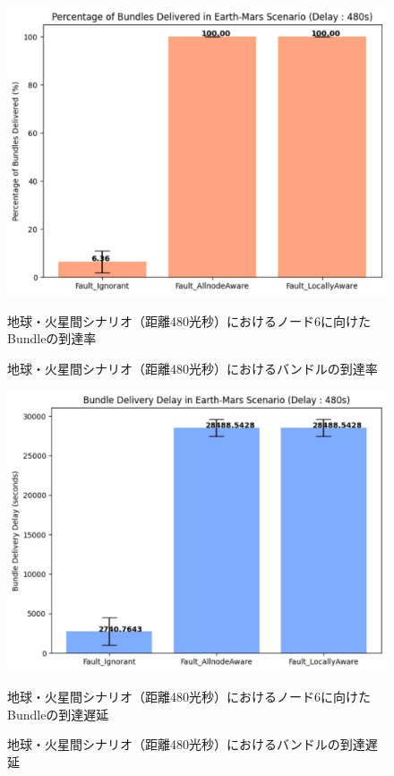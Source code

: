 \begin{figure}[tbh]
    \centering
    \includegraphics[width=0.7\textheight]{results/mars_distance_480/mars_480_bundle.pdf}
    \caption{地球・火星間シナリオ（距離480光秒）におけるバンドルの到達率}
    \label{fig:graph_bundle_earth_mars_480}
    \begin{minipage}{\textwidth}
        \centering
        \vspace{3mm}
        地球・火星間シナリオ（距離480光秒）におけるノード6に向けたBundleの到達率
    \end{minipage}
\end{figure}

\begin{figure}[tbh]
    \centering
    \includegraphics[width=0.7\textheight]{results/mars_distance_480/mars_480_delay.pdf}
    \caption{地球・火星間シナリオ（距離480光秒）におけるバンドルの到達遅延}
    \label{fig:graph_delay_earth_mars_480}
    \begin{minipage}{\textwidth}
        \centering
        \vspace{3mm}
        地球・火星間シナリオ（距離480光秒）におけるノード6に向けたBundleの到達遅延
    \end{minipage}
\end{figure}

